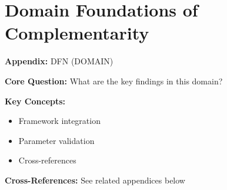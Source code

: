 %
%
%
%

\chapter{Domain Foundations of Complementarity}
\label{app:domain-found}


\begin{tcolorbox}[colback=blue!5!white, colframe=blue!75!black,
    title=Quick Reference: Appendix UNMAPPED_DFN]

\textbf{Appendix:} DFN (DOMAIN)

\textbf{Core Question:} What are the key findings in this domain?

\textbf{Key Concepts:}
\begin{itemize}[nosep]
\item Framework integration
\item Parameter validation
\item Cross-references
\end{itemize}

\textbf{Cross-References:} See related appendices below
\end{tcolorbox}

\begin{abstract}
This appendix bridges the gap between pure mathematical complementarity theory
(Appendix UNMAPPED_FND) and domain-specific applications. We establish how the abstract
mathematical structures—lattices, supermodularity, and interaction tensors—manifest
in three primary domains: \textbf{Economics} (utility theory, production, games),
\textbf{Psychology} (behavioral interactions, cognitive complementarities), and
\textbf{Management} (organizational design, strategic fit). For each domain, we
provide: (1) the interpretation of $\gamma$, (2) domain-specific axioms,
(3) measurement approaches, and (4) typical parameter ranges from empirical literature.
This creates the foundation for Layer 4: EBF-specific application.
\end{abstract}

